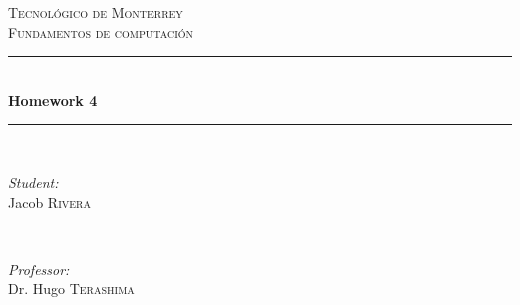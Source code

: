 \documentclass{article}
\begin{document}
\begin{titlepage}

    \newcommand{\HRule}{\rule{\linewidth}{0.5mm}} %

    \center %


    \textsc{\LARGE Tecnológico de Monterrey}\\[1.5cm] %
    \textsc{\Large Fundamentos de computación}\\[0.5cm] %


    \HRule \\[0.4cm]
    { \huge \bfseries Homework 4}\\[0.4cm] %
    \HRule \\[1.5cm]


    \begin{minipage}{0.4\textwidth}
    \begin{flushleft} \large
    \emph{Student:}\\
    Jacob \textsc{Rivera} %
    \end{flushleft}
    \end{minipage}
    ~
    \begin{minipage}{0.4\textwidth}
    \begin{flushright} \large
    \emph{Professor:} \\
    Dr. Hugo \textsc{Terashima} %
    \end{flushright}
    \end{minipage}\\[2cm]


\end{titlepage}
\end{document}
